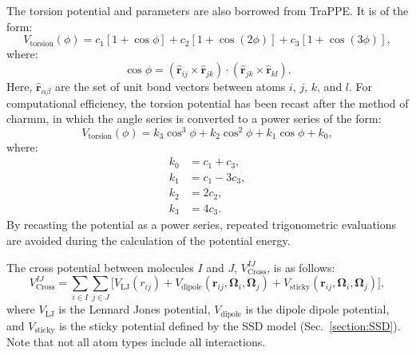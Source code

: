 \documentclass[]{book}
\begin{document}
The torsion potential and parameters are also borrowed from TraPPE. It is
of the form:
\begin{equation}
V_{\text{torsion}}(\phi) = c_1[1 + \cos \phi] 
	+ c_2[1 + \cos(2\phi)] 
 	+ c_3[1 + \cos(3\phi)],
\label{eq:origTorsionPot}
\end{equation}
where:
\begin{equation}
\cos\phi = (\hat{\mathbf{r}}_{ij} \times \hat{\mathbf{r}}_{jk}) \cdot
	(\hat{\mathbf{r}}_{jk} \times \hat{\mathbf{r}}_{kl}).
\label{eq:torsPhi}
\end{equation}
Here, $\hat{\mathbf{r}}_{\alpha\beta}$ are the set of unit bond
vectors between atoms $i$, $j$, $k$, and $l$. For computational
efficiency, the torsion potential has been recast after the method of
{\sc charmm},\cite{Brooks83} in which the angle series is converted to
a power series of the form:
\begin{equation}
V_{\text{torsion}}(\phi) =  
	k_3 \cos^3 \phi + k_2 \cos^2 \phi + k_1 \cos \phi + k_0,
\label{eq:torsionPot}
\end{equation}
where:
\begin{align*}
k_0 &= c_1 + c_3, \\
k_1 &= c_1 - 3c_3, \\
k_2 &= 2 c_2, \\
k_3 &= 4c_3.
\end{align*}
By recasting the potential as a power series, repeated trigonometric
evaluations are avoided during the calculation of the potential
energy.


The cross potential between molecules $I$ and $J$,
$V^{IJ}_{\text{Cross}}$, is as follows:
\begin{equation}
V^{IJ}_{\text{Cross}} = 
	\sum_{i \in I} \sum_{j \in J}
	\biggl[ V_{\text{LJ}}(r_{ij}) +  V_{\text{dipole}}
	(\mathbf{r}_{ij},\boldsymbol{\Omega}_{i},\boldsymbol{\Omega}_{j})
	+ V_{\text{sticky}}
	(\mathbf{r}_{ij},\boldsymbol{\Omega}_{i},\boldsymbol{\Omega}_{j})
	\biggr],
\label{eq:crossPotentail}
\end{equation}
where $V_{\text{LJ}}$ is the Lennard Jones potential,
$V_{\text{dipole}}$ is the dipole dipole potential, and
$V_{\text{sticky}}$ is the sticky potential defined by the SSD model
(Sec.~\ref{section:SSD}). Note that not all atom types include all
interactions.
\end{document}
